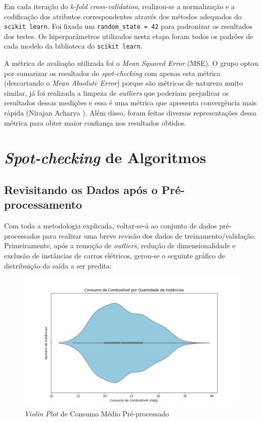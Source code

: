 \documentclass{report}
\let\oldsection\section
\renewcommand\section{\clearpage\oldsection}
\begin{document}
Em cada iteração do \textit{k-fold cross-validation}, realizou-se a normalização e a codificação dos atributos correspondentes através dos métodos adequados do \texttt{scikit learn}. Foi fixada um \texttt{random\_state = 42}
para padronizar os resultados dos testes. Os hiperparâmetros utilizados nesta etapa foram todos os padrões de cada modelo da biblioteca do \texttt{scikit learn}.

A métrica de avaliação utilizada foi o \textit{Mean Squared Error} (MSE). O grupo optou por sumarizar os resultados do \textit{spot-checking} com apenas esta métrica (descartando o \textit{Mean Absolute Error}) porque são métricas
de natureza muito similar, já foi realizada a limpeza de \textit{outliers} que poderiam prejudicar os resultados dessas medições e essa é uma métrica que apresenta convergência mais rápida (Nirajan Acharya \cite{MSEAndMAE}). Além
disso, foram feitas diversas representações dessa métrica para obter maior confiança nos resultados obtidos.

\section{\textit{Spot-checking} de Algoritmos}

\subsection{Revisitando os Dados após o Pré-processamento}
\label{subsec:revisit_pre}

Com toda a metodologia explicada, voltar-se-á ao conjunto de dados pré-processados para realizar uma breve revisão dos dados de treinamento/validação. Primeiramente, após a remoção de \textit{outliers}, redução de dimensionalidade
e exclusão de instâncias de carros elétricos, gerou-se o seguinte gráfico de distribuição da saída a ser predita:

\begin{figure}[h!]
  \centering
  \includegraphics[width=.85\linewidth]{images/plots/violin_plots/no_outliers_combination_mpg.png}
  \caption{\label{img:pre_combination_dist} \textit{Violin Plot} de Consumo Médio Pré-processado}
\end{figure}
\end{document}
